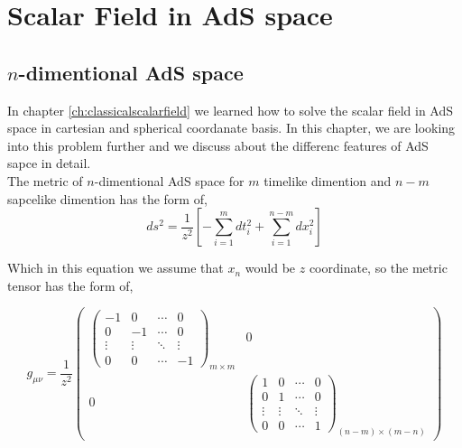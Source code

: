\chapter{Scalar Field in AdS space}
\label{ch:scalarfieldAdS}

\section{$n$-dimentional AdS space} \label{sec:n-dimentionalAdSspace}

In chapter \ref{ch:classicalscalarfield} we learned how to solve the scalar field in AdS space in cartesian and spherical coordanate basis. In this chapter, we are looking into this problem further and we discuss about the differenc features of AdS sapce in detail.\\

The metric of $n$-dimentional AdS space for $m$ timelike dimention and $n-m$ sapcelike dimention has the form of,\\

\begin{equation}\label{eq:nAdSmetric}
    ds^2 = \frac{1}{z^2} \left[ - \sum\limits_{i=1}^{m} dt_i^2 + \sum\limits_{i=1}^{n-m} dx_i^2 \right]
\end{equation}

Which in this equation we assume that $x_n$ would be $z$ coordinate, so the metric tensor has the form of, 

\begin{equation}\label{eq:nAdSmetrictensor}
    g_{\mu\nu} = \frac{1}{z^2}
    \begin{pmatrix}
        \begin{pmatrix}
            -1 & 0 & \cdots & 0 \\
            0 & -1 & \cdots & 0 \\
            \vdots  & \vdots  & \ddots & \vdots  \\
            0 & 0 & \cdots & -1
        \end{pmatrix}_{m \times m}
         & 0\\
        0 &
        \begin{pmatrix}
            1 & 0 & \cdots & 0 \\
            0 & 1 & \cdots & 0 \\
            \vdots  & \vdots  & \ddots & \vdots  \\
            0 & 0 & \cdots & 1
        \end{pmatrix} _{(n-m) \times (m-n)}
    \end{pmatrix}
\end{equation}

